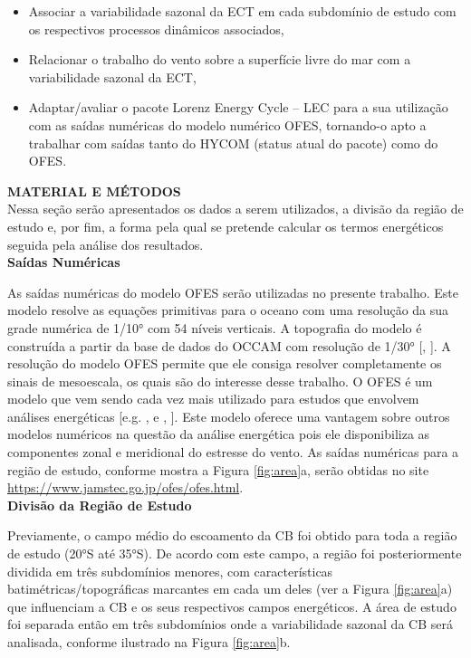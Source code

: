 \documentclass[portuguese,12pt,a4paper]{article}
\begin{document}
\begin{itemize}
\item  Associar a variabilidade sazonal da ECT em cada subdomínio de estudo com os
respectivos processos dinâmicos associados,

\item  Relacionar o trabalho do vento sobre a superfície livre do mar com a variabilidade sazonal da ECT,

\item Adaptar/avaliar o pacote Lorenz Energy Cycle – LEC para a sua utilização com as saídas numéricas do modelo numérico OFES, tornando-o apto a trabalhar com
saídas tanto do HYCOM (status atual do pacote) como do OFES. 
\end{itemize}

\textbf{MATERIAL E MÉTODOS} \\

Nessa seção serão apresentados os dados a serem utilizados, a divisão da região de
estudo e, por fim, a forma pela qual se pretende calcular os termos energéticos seguida pela análise dos resultados. \\

\textbf{Saídas Numéricas}

As saídas numéricas do modelo OFES serão utilizadas no presente trabalho. Este modelo resolve as equações primitivas para o oceano com uma resolução da sua grade numérica de 1/10° com 54 níveis verticais. A topografia do modelo é construída a partir da base de dados do OCCAM com resolução de 1/30°  [, \citeyear{masumoto2004fifty}]. A resolução do modelo OFES permite que ele consiga resolver completamente os sinais de mesoescala, os quais são do interesse desse trabalho. O OFES é um modelo que vem sendo cada vez mais utilizado para estudos que
envolvem análises energéticas  [e.g. , \citeyear{zhang2021seasonal} e , \citeyear{yan2023seasonal}]. Este modelo oferece uma vantagem sobre outros modelos numéricos na questão da análise energética pois ele disponibiliza as componentes zonal e meridional do estresse do vento. As saídas numéricas para a região de estudo, conforme mostra a Figura \ref{fig:area}a, serão obtidas no site \url{https://www.jamstec.go.jp/ofes/ofes.html}. \\


\textbf{Divisão da Região de Estudo}

Previamente, o campo médio do escoamento da CB foi obtido para toda a região de estudo (20°S até 35°S). De acordo com este campo, a região foi posteriormente dividida em três subdomínios menores, com características batimétricas/topográficas marcantes em cada um deles (ver a Figura \ref{fig:area}a) que
influenciam a CB e os seus respectivos campos energéticos. A área de estudo foi
separada então em três subdomínios onde a variabilidade sazonal da CB será
analisada, conforme ilustrado na Figura \ref{fig:area}b.
\end{document}
